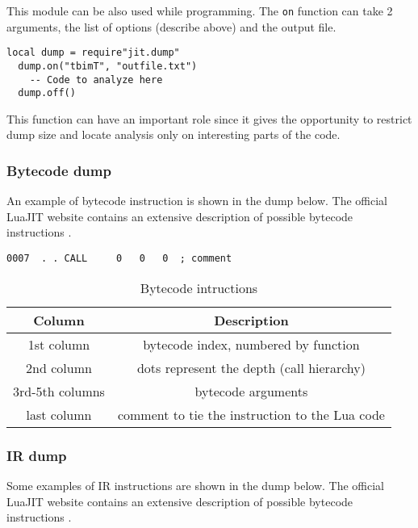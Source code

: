 \noindent
This module can be also used while programming. The \texttt{on} function can take 2 arguments, the list of options (describe above) and the output file.
\begin{lstlisting}[style=CommandsLuaJIT]
  local dump = require"jit.dump"
  dump.on("tbimT", "outfile.txt")
    -- Code to analyze here
  dump.off()
\end{lstlisting}
This function can have an important role since it gives the opportunity to restrict dump size and locate analysis only on interesting parts of the code. 


\subsubsection{Bytecode dump}

An example of bytecode instruction is shown in the dump below. The official LuaJIT website contains an extensive description of possible bytecode instructions \cite{luajit-bc}.

\begin{lstlisting}[style=CommandsLuaJIT]
0007  . . CALL     0   0   0  ; comment
\end{lstlisting}

\begin{table}[H]
\centering
\begin{tabular}{ |c|c| } 
 \hline
 Column & Description \\
 \hline
 1st column &  bytecode index, numbered by function\\
 2nd column & dots represent the depth (call hierarchy)\\
 3rd-5th columns& bytecode arguments\\
 last column & comment to tie the instruction to the Lua code\\
 \hline
\end{tabular}
\caption{Bytecode intructions}
\end{table}


\subsubsection{IR dump}

Some examples of IR instructions are shown in the dump below. The official LuaJIT website contains an extensive description of possible bytecode instructions \cite{luajit-ir}.

